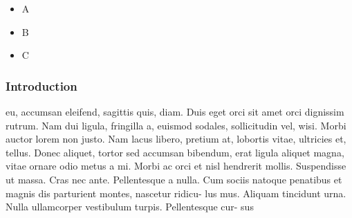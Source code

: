 \documentclass[12pt]{report}
\newcommand{\Triangle}{$\blacktriangleright$}
\newenvironment{items}[2]
{      
        \begin{itemize}[font=\color{#1}, label=#2]  
    }
    { 
        \end{itemize}
}%
\begin{document}
\begin{items}{orange}{\Triangle}
    \item A
    \item B
    \item C
\end{items}

\subsubsection{Introduction}

eu, accumsan eleifend, sagittis quis, diam. Duis eget orci sit amet orci dignissim rutrum.
Nam dui ligula, fringilla a, euismod sodales, sollicitudin vel, wisi. Morbi auctor lorem
non justo. Nam lacus libero, pretium at, lobortis vitae, ultricies et, tellus. Donec aliquet,
tortor sed accumsan bibendum, erat ligula aliquet magna, vitae ornare odio metus a mi.
Morbi ac orci et nisl hendrerit mollis. Suspendisse ut massa. Cras nec ante. Pellentesque
a nulla. Cum sociis natoque penatibus et magnis dis parturient montes, nascetur ridicu-
lus mus. Aliquam tincidunt urna. Nulla ullamcorper vestibulum turpis. Pellentesque cur-
sus
\end{document}
